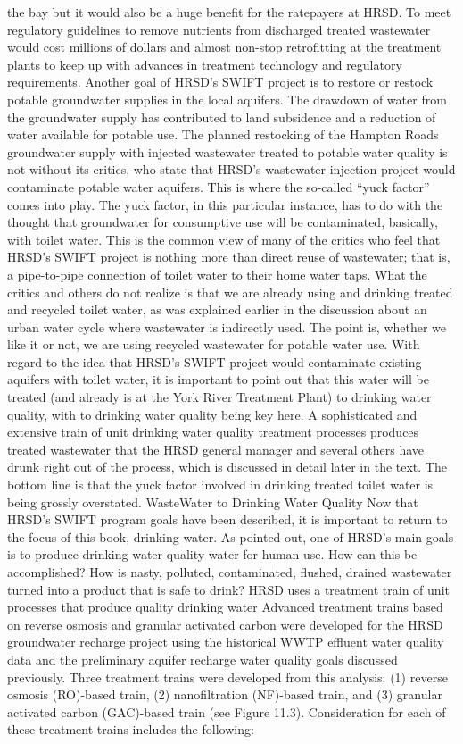 \documentclass{article}
\begin{document}
the bay but it would also be a huge benefit for the ratepayers at HRSD.
To meet regulatory guidelines to remove nutrients from discharged
treated wastewater would cost millions of dollars and almost non-stop
retrofitting at the treatment plants to keep up with advances in
treatment technology and regulatory requirements. Another goal of HRSD's
SWIFT project is to restore or restock potable groundwater supplies in
the local aquifers. The drawdown of water from the groundwater supply
has contributed to land subsidence and a reduction of water available
for potable use. The planned restocking of the Hampton Roads groundwater
supply with injected wastewater treated to potable water quality is not
without its critics, who state that HRSD's wastewater injection project
would contaminate potable water aquifers. This is where the so-called
``yuck factor'' comes into play. The yuck factor, in this particular
instance, has to do with the thought that groundwater for consumptive
use will be contaminated, basically, with toilet water. This is the
common view of many of the critics who feel that HRSD's SWIFT project is
nothing more than direct reuse of wastewater; that is, a pipe-to-pipe
connection of toilet water to their home water taps. What the critics
and others do not realize is that we are already using and drinking
treated and recycled toilet water, as was explained earlier in the
discussion about an urban water cycle where wastewater is indirectly
used. The point is, whether we like it or not, we are using recycled
wastewater for potable water use. With regard to the idea that HRSD's
SWIFT project would contaminate existing aquifers with toilet water, it
is important to point out that this water will be treated (and already
is at the York River Treatment Plant) to drinking water quality, with to
drinking water quality being key here. A sophisticated and extensive
train of unit drinking water quality treatment processes produces
treated wastewater that the HRSD general manager and several others have
drunk right out of the process, which is discussed in detail later in
the text. The bottom line is that the yuck factor involved in drinking
treated toilet water is being grossly overstated. WasteWater to Drinking
Water Quality Now that HRSD's SWIFT program goals have been described,
it is important to return to the focus of this book, drinking water. As
pointed out, one of HRSD's main goals is to produce drinking water
quality water for human use. How can this be accomplished? How is nasty,
polluted, contaminated, flushed, drained wastewater turned into a
product that is safe to drink? HRSD uses a treatment train of unit
processes that produce quality drinking water Advanced treatment trains
based on reverse osmosis and granular activated carbon were developed
for the HRSD groundwater recharge project using the historical WWTP
effluent water quality data and the preliminary aquifer recharge water
quality goals discussed previously. Three treatment trains were
developed from this analysis: (1) reverse osmosis (RO)-based train, (2)
nanofiltration (NF)-based train, and (3) granular activated carbon
(GAC)-based train (see Figure 11.3). Consideration for each of these
treatment trains includes the following:
\end{document}
